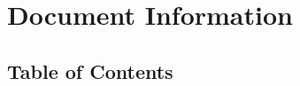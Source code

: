 \documentclass[a4paper,12pt,twoside]{article}
\begin{document}

\setcounter{section}{-1}
\section{Document Information}


\newpage
\subsection{Table of Contents}
\tableofcontents
\newpage

\newpage

\newpage

\newpage

\end{document}

